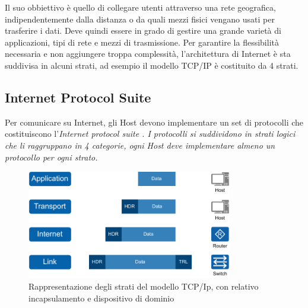 Il suo obbiettivo è quello di collegare utenti attraverso una rete geografica, indipendentemente dalla distanza o da quali mezzi fisici vengano usati per trasferire i dati. Deve quindi essere in grado di gestire una grande varietà di applicazioni, tipi di rete e mezzi di trasmissione. Per garantire la flessibilità necessaria e non aggiungere troppa complessità, l'architettura di Internet è sta suddivisa in alcuni strati, ad esempio il modello TCP/IP è costituito da 4 strati. 

\newpage
\subsection{Internet Protocol Suite}

Per comunicare su Internet, gli Host devono implementare un set di protocolli che costituiscono l'\it{Internet protocol suite} \cite{RFC_1122}. I protocolli si suddividono in strati logici che li raggruppano in 4 categorie, ogni Host deve implementare almeno un protocollo per ogni strato.

\begin{figure}[H]
    \centering
    \includegraphics[width=0.8\textwidth]{immagini/diag2-modello_a_strati}
    \caption{Rappresentazione degli strati del modello TCP/Ip, con relativo incapsulamento e dispositivo di dominio}
    \label{fig:modello-a-strati}
\end{figure}

